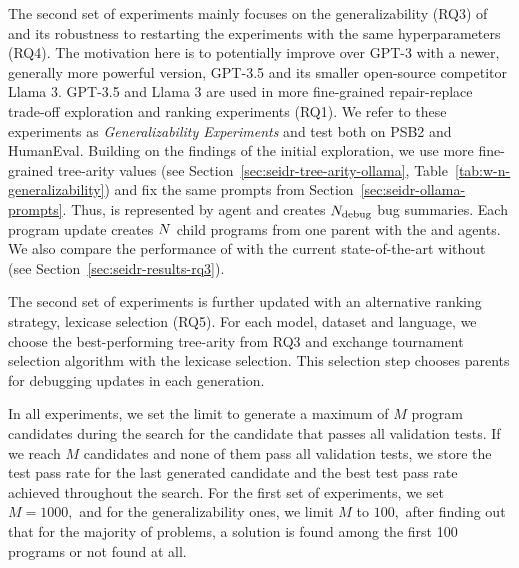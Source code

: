 The second set of experiments mainly focuses on the generalizability (RQ3) of \method{} and its robustness to restarting the experiments with the same hyperparameters (RQ4).
The motivation here is to potentially improve over GPT-3 with a newer, generally more powerful version, GPT-3.5 and its smaller open-source competitor Llama 3.
GPT-3.5 and Llama 3 are used in more fine-grained repair-replace trade-off exploration and ranking experiments (RQ1). 
We refer to these experiments as \emph{\method{} Generalizability Experiments} and test \method{} both on PSB2 and HumanEval.
Building on the findings of the initial exploration, we use more fine-grained tree-arity values (see Section~\ref{sec:seidr-tree-arity-ollama}, Table~\ref{tab:w-n-generalizability}) and fix the same prompts from Section~\ref{sec:seidr-ollama-prompts}. 
Thus, \instruct{} is represented by \instructllm{} agent and creates $N_\text{debug}{}$ bug summaries.
Each program update creates $N{}$ child programs from one parent with the \synthesize{} and \debug{} agents.
We also compare the performance of \method{} with the current state-of-the-art without \method{} (see Section~\ref{sec:seidr-results-rq3}).

The second set of experiments is further updated with an alternative ranking strategy, lexicase selection (RQ5). 
For each model, dataset and language, we choose the best-performing tree-arity from RQ3 and exchange tournament selection algorithm with the lexicase selection. 
This selection step chooses parents for debugging updates in each generation. 


In all experiments, we set the limit to generate a maximum of $M$ program candidates during the search for the candidate that passes all validation tests. 
If we reach $M$ candidates and none of them pass all validation tests, we store the test pass rate for the last generated candidate and the best test pass rate achieved throughout the search. 
For the first set of experiments, we set $M = 1000,$ and for the generalizability ones, we limit $M$  to $100,$ after finding out that for the majority of problems, a solution is found among the first 100 programs or not found at all.




